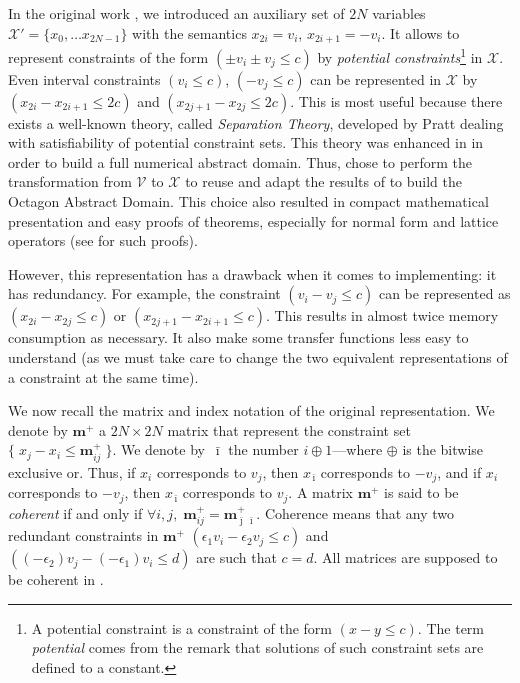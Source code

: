 \documentclass[twosides]{report}
\renewcommand{\vec}[1]{{{\mathbf #1}}}
\newcommand{\itop}{{\,\bar{\imath}}}
\newcommand{\jtop}{{\bar{\jmath}}}
\begin{document}
In the original work \cite{mine:ast01}, we introduced an auxiliary set of
$2N$ variables $\mathcal{X}'=\{x_0,\ldots x_{2N-1}\}$ with the semantics
$x_{2i}=v_i$, $x_{2i+1}=-v_i$.
It allows to represent constraints of the form $(\pm v_i \pm v_j\leq c)$
by {\em potential constraints}\footnote{A potential constraint is a constraint
of the form $(x-y\leq c)$. The term {\em potential} comes from the remark that
solutions of such constraint sets are defined to a constant.}\/ in
$\mathcal{X}$. Even interval constraints $(v_i\leq c)$, $(-v_j\leq c)$ can
be represented in $\mathcal{X}$ by $(x_{2i}-x_{2i+1}\leq 2c)$ and
$(x_{2j+1}-x_{2j}\leq 2c)$.
This is most useful because there exists a well-known theory, called
{\em  Separation Theory}, developed by Pratt \cite{pratt} dealing with
satisfiability of potential constraint sets.
This theory was enhanced in \cite{mine:padoII} in order to build a full
numerical abstract domain.
Thus, \cite{mine:ast01} chose to perform the transformation from
$\mathcal{V}$ to $\mathcal{X}$ to reuse and adapt the results of
\cite{mine:padoII} to build the Octagon Abstract Domain.
This choice also resulted in compact mathematical presentation and
easy proofs of theorems, especially for normal form and lattice operators
(see \cite{mine:dea} for such proofs).

However, this representation has a drawback when it comes to
implementing: it has redundancy.
For example, the constraint $(v_i-v_j\leq c)$ can be represented as
$(x_{2i}-x_{2j}\leq c)$ or $(x_{2j+1}-x_{2i+1}\leq c)$.
This results in almost twice memory consumption as necessary.
It also make some transfer functions less easy to understand (as we must take
care to change the two equivalent representations of a constraint at the same
time).

\index{.m@$\vec{m}^+$}
We now recall the matrix and index notation of the original representation.
We denote by $\vec{m}^+$ a $2N\times 2N$ matrix that represent the
constraint set $\{\;x_j-x_i\leq \vec{m}^+_{ij}\;\}$.
\index{.it@$\itop$}
We denote by $\itop$ the number $i\oplus 1$---where $\oplus$ is the bitwise 
exclusive or.
Thus, if $x_{i}$ corresponds to $v_j$, then $x_{\itop}$ corresponds to
$-v_j$, and if $x_{i}$ corresponds to $-v_j$, then $x_{\itop}$ corresponds
to $v_j$.
A matrix $\vec{m}^+$ is said to be {\em coherent\/} if and only if
$\forall i,j,\;\vec{m}^+_{ij}=\vec{m}^+_{\jtop \itop}$.
Coherence means that any two redundant constraints in $\vec{m}^+$ 
$(\epsilon_1 v_i - \epsilon_2 v_j\leq c)$ and
$((-\epsilon_2) v_j - (-\epsilon_1) v_i \leq d)$
are such that $c=d$.
All matrices are supposed to be coherent in \cite{mine:ast01}.
\end{document}
